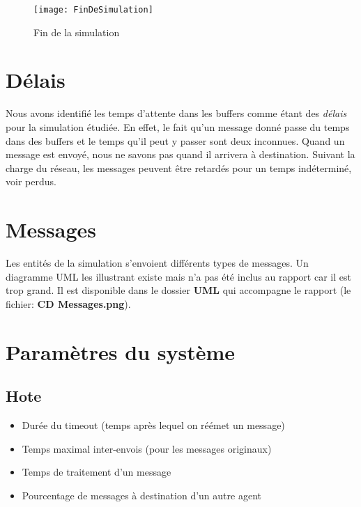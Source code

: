 \documentclass[a4paper,11pt]{article}
\begin{document}
\begin{figure}[h!t]
  \centering
    \texttt{[image: FinDeSimulation]}
  \caption{Fin de la simulation}
  \label{fig:fin-de-simulation}
\end{figure}











\section{Délais}
Nous avons identifié les temps d'attente dans les buffers comme étant des \textit{délais} pour la simulation étudiée. En effet, le fait qu'un message donné passe du temps dans des buffers et le temps qu'il peut y passer sont deux inconnues. Quand un message est envoyé, nous ne savons pas quand il arrivera à destination. Suivant la charge du réseau, les messages peuvent être retardés pour un temps indéterminé, voir perdus.





\section{Messages}
Les entités de la simulation s'envoient différents types de messages. Un diagramme UML les illustrant existe mais n'a pas été inclus au rapport car il est trop grand. Il est disponible dans le dossier \textbf{UML} qui accompagne le rapport (le fichier: \textbf{CD Messages.png}).








\section{Paramètres du système}

\subsection{Hote}
\begin{itemize}
 \item Durée du timeout (temps après lequel on réémet un message)
 \item Temps maximal inter-envois (pour les messages originaux)
 \item Temps de traitement d'un message
 \item Pourcentage de messages à destination d'un autre agent
\end{itemize}
\end{document}
